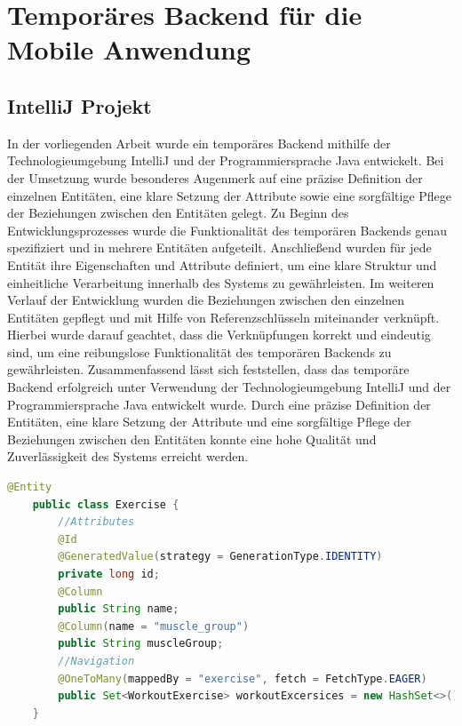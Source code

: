 \section{Temporäres Backend für die Mobile Anwendung}

\subsection{IntelliJ Projekt}
In der vorliegenden Arbeit wurde ein temporäres Backend mithilfe der Technologieumgebung IntelliJ \cite{Quarkus} und der Programmiersprache Java  \cite{Java} entwickelt. Bei der Umsetzung wurde besonderes Augenmerk auf eine präzise Definition der einzelnen Entitäten, eine klare Setzung der Attribute sowie eine sorgfältige Pflege der Beziehungen zwischen den Entitäten gelegt.
\newline
\newline
Zu Beginn des Entwicklungsprozesses wurde die Funktionalität des temporären Backends genau spezifiziert und in mehrere Entitäten aufgeteilt. Anschließend wurden für jede Entität ihre Eigenschaften und Attribute definiert, um eine klare Struktur und einheitliche Verarbeitung innerhalb des Systems zu gewährleisten.
\newline
\newline
Im weiteren Verlauf der Entwicklung wurden die Beziehungen zwischen den einzelnen Entitäten gepflegt und mit Hilfe von Referenzschlüsseln miteinander verknüpft. Hierbei wurde darauf geachtet, dass die Verknüpfungen korrekt und eindeutig sind, um eine reibungslose Funktionalität des temporären Backends zu gewährleisten.
\newline
\newline
Zusammenfassend lässt sich feststellen, dass das temporäre Backend erfolgreich unter Verwendung der Technologieumgebung IntelliJ und der Programmiersprache Java entwickelt wurde. Durch eine präzise Definition der Entitäten, eine klare Setzung der Attribute und eine sorgfältige Pflege der Beziehungen zwischen den Entitäten konnte eine hohe Qualität und Zuverlässigkeit des Systems erreicht werden.
\newpage
\begin{lstlisting}[language=Java,caption=Entity | Person,label=lst:impl:foo]
    @Entity
    public class Exercise {
        //Attributes
        @Id
        @GeneratedValue(strategy = GenerationType.IDENTITY)
        private long id;
        @Column
        public String name;
        @Column(name = "muscle_group")
        public String muscleGroup;
        //Navigation
        @OneToMany(mappedBy = "exercise", fetch = FetchType.EAGER)
        public Set<WorkoutExercise> workoutExcersices = new HashSet<>();
    }
\end{lstlisting}

